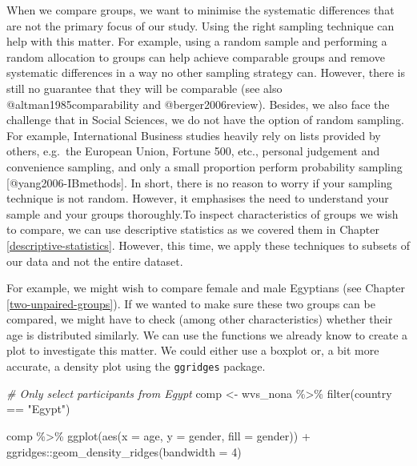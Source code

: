 \documentclass[
]{book}
\newenvironment{Shaded}{\begin{snugshade}}{\end{snugshade}}
\newcommand{\AttributeTok}[1]{\textcolor[rgb]{0.77,0.63,0.00}{#1}}
\newcommand{\CommentTok}[1]{\textcolor[rgb]{0.56,0.35,0.01}{\textit{#1}}}
\newcommand{\DecValTok}[1]{\textcolor[rgb]{0.00,0.00,0.81}{#1}}
\newcommand{\FunctionTok}[1]{\textcolor[rgb]{0.00,0.00,0.00}{#1}}
\newcommand{\NormalTok}[1]{#1}
\newcommand{\OtherTok}[1]{\textcolor[rgb]{0.56,0.35,0.01}{#1}}
\newcommand{\SpecialCharTok}[1]{\textcolor[rgb]{0.00,0.00,0.00}{#1}}
\newcommand{\StringTok}[1]{\textcolor[rgb]{0.31,0.60,0.02}{#1}}
\begin{document}
When we compare groups, we want to minimise the systematic differences that are not the primary focus of our study. Using the right sampling technique can help with this matter. For example, using a random sample and performing a random allocation to groups can help achieve comparable groups and remove systematic differences in a way no other sampling strategy can. However, there is still no guarantee that they will be comparable (see also @altman1985comparability and @berger2006review). Besides, we also face the challenge that in Social Sciences, we do not have the option of random sampling. For example, International Business studies heavily rely on lists provided by others, e.g.~the European Union, Fortune 500, etc., personal judgement and convenience sampling, and only a small proportion perform probability sampling {[}@yang2006-IBmethods{]}. In short, there is no reason to worry if your sampling technique is not random. However, it emphasises the need to understand your sample and your groups thoroughly.To inspect characteristics of groups we wish to compare, we can use descriptive statistics as we covered them in Chapter \ref{descriptive-statistics}. However, this time, we apply these techniques to subsets of our data and not the entire dataset.

For example, we might wish to compare female and male Egyptians (see Chapter \ref{two-unpaired-groups}). If we wanted to make sure these two groups can be compared, we might have to check (among other characteristics) whether their age is distributed similarly. We can use the functions we already know to create a plot to investigate this matter. We could either use a boxplot or, a bit more accurate, a density plot using the \texttt{ggridges} package.

\begin{Shaded}
\begin{Highlighting}[]
\CommentTok{\# Only select participants from \textquotesingle{}Egypt\textquotesingle{}}
\NormalTok{comp }\OtherTok{\textless{}{-}}\NormalTok{ wvs\_nona }\SpecialCharTok{\%\textgreater{}\%}
  \FunctionTok{filter}\NormalTok{(country }\SpecialCharTok{==} \StringTok{"Egypt"}\NormalTok{)}

\NormalTok{comp }\SpecialCharTok{\%\textgreater{}\%}
  \FunctionTok{ggplot}\NormalTok{(}\FunctionTok{aes}\NormalTok{(}\AttributeTok{x =}\NormalTok{ age,}
             \AttributeTok{y =}\NormalTok{ gender,}
             \AttributeTok{fill =}\NormalTok{ gender)) }\SpecialCharTok{+}
\NormalTok{  ggridges}\SpecialCharTok{::}\FunctionTok{geom\_density\_ridges}\NormalTok{(}\AttributeTok{bandwidth =} \DecValTok{4}\NormalTok{)}
\end{Highlighting}
\end{Shaded}
\end{document}
